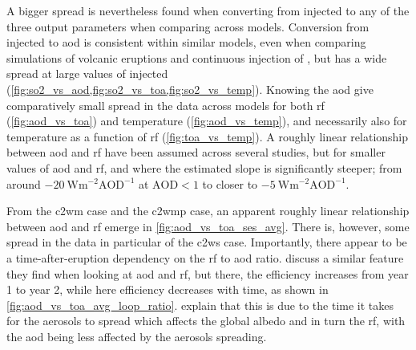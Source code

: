 \documentclass{ametsocV5}
\newcommand{\iso}[1][i]{{#1}njected \ce{SO2}}
\begin{document}
A bigger spread is nevertheless found when converting from \iso{} to any of the three
output parameters when comparing across models. Conversion from \iso{} to \ac{aod} is
consistent within similar models, even when comparing simulations of volcanic eruptions
\citep{timmreck2010} and continuous injection of  \citep{niemeier2015}, but has
a wide spread at large values of \iso{}
(\cref{fig:so2_vs_aod,fig:so2_vs_toa,fig:so2_vs_temp}). Knowing the \ac{aod} give
comparatively small spread in the data across models for both \ac{rf}
(\cref{fig:aod_vs_toa}) and temperature (\cref{fig:aod_vs_temp}), and necessarily also
for temperature as a function of \ac{rf} (\cref{fig:toa_vs_temp}). A roughly linear
relationship between \ac{aod} and \ac{rf} have been assumed across several studies, but
for smaller values of \ac{aod} and \ac{rf}, and where the estimated slope is
significantly steeper; from around \(\SI{-20}{\watt\metre^{-2}\mathrm{AOD}^{-1}}\) at
\(\mathrm{AOD}<1\) to closer to \(\SI{-5}{\watt\metre^{-2}\mathrm{AOD}^{-1}}\).

From the \ac{c2wm} case and the \ac{c2wmp} case, an apparent roughly linear relationship
between \ac{aod} and \ac{rf} emerge in \cref{fig:aod_vs_toa_ses_avg}. There is, however,
some spread in the data in particular of the \ac{c2ws} case. Importantly, there appear
to be a time-after-eruption dependency on the \ac{rf} to \ac{aod} ratio.
\citet{marshall2020} discuss a similar feature they find when looking at \ac{aod} and
\ac{rf}, but there, the efficiency increases from year 1 to year 2, while here
efficiency decreases with time, as shown in \cref{fig:aod_vs_toa_avg_loop_ratio}.
\citet{marshall2020} explain that this is due to the time it takes for the aerosols to
spread which affects the global albedo and in turn the \ac{rf}, with the \ac{aod} being
less affected by the aerosols spreading.
\end{document}
